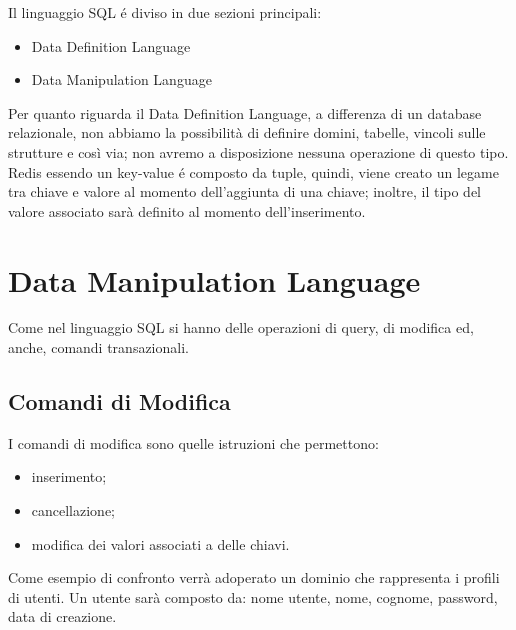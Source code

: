Il linguaggio SQL é diviso in due sezioni principali:
\begin{itemize}
    \item Data Definition Language
    \item Data Manipulation Language
\end{itemize}

Per quanto riguarda il Data Definition Language, a differenza di un database relazionale, non abbiamo la possibilità di definire
domini, tabelle, vincoli sulle strutture e così via; non avremo a disposizione nessuna operazione di questo tipo.\\
Redis essendo un key-value é composto da tuple, quindi, viene creato un legame tra chiave e valore al momento dell'aggiunta di una chiave; inoltre, il tipo del valore
associato sarà definito al momento dell'inserimento.
\section{Data Manipulation Language}
Come nel linguaggio SQL si hanno delle operazioni di query, di modifica ed, anche, comandi transazionali.

\subsection{Comandi di Modifica}
I comandi di modifica sono quelle istruzioni che permettono:
\begin{itemize}
    \item inserimento;
    \item cancellazione;
    \item modifica dei valori associati a delle chiavi.\\
\end{itemize}


Come esempio di confronto verrà adoperato un dominio che rappresenta i profili di utenti.
Un utente sarà composto da: nome utente, nome, cognome, password, data di creazione.\\

